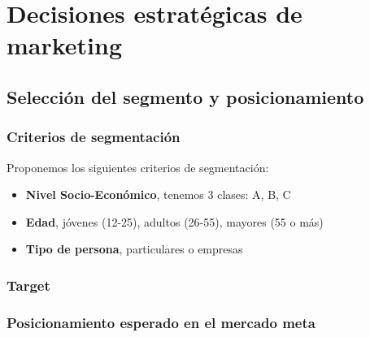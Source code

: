 \chapter{Decisiones estratégicas de marketing}

\section{Selección del segmento y posicionamiento}
\subsection{Criterios de segmentación}
Proponemos los siguientes criterios de segmentación:
\begin{itemize}
    \item \textbf{Nivel Socio-Económico}, tenemos 3 clases: A, B, C
    \item \textbf{Edad}, jóvenes (12-25), adultos (26-55), mayores (55 o más)
    \item \textbf{Tipo de persona}, particulares o empresas
\end{itemize}

\subsection{Target}

\subsection{Posicionamiento esperado en el mercado meta}
